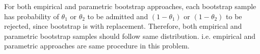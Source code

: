 \documentclass[12pt,letterpaper]{article}
\begin{document}
\noindent For both empirical and parametric bootstrap approaches, each bootstrap sample has probability of $\theta_1$ or $\theta_2$ to be admitted and $(1 - \theta_1)$ or $(1- \theta_2)$ to be rejected, since bootstrap is with replacement. Therefore, both empirical and parametric bootstrap samples should follow same distribution. i.e. empirical and parametric approaches are same procedure in this problem. 




\end{document}
